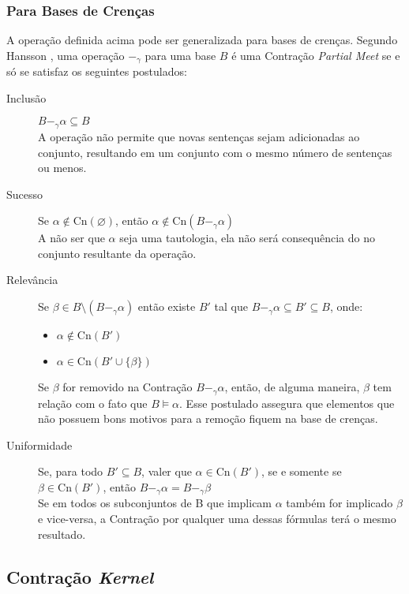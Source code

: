 \subsubsection{Para Bases de Crenças}

A operação definida acima pode ser generalizada para bases de crenças. Segundo Hansson \cite{revisaoHansson2}, uma operação $ -_{\gamma} $ para uma base $ B $ é uma Contração \textit{Partial Meet} se e só se satisfaz os seguintes postulados:

\begin{description}
	\item[Inclusão] $ B -_{\gamma} \alpha \subseteq B$ \\ A operação não permite que novas sentenças sejam adicionadas ao conjunto, resultando em um conjunto com o mesmo número de sentenças ou menos.
	\item[Sucesso] Se $ \alpha \notin \text{Cn}(\varnothing) $, então $ \alpha \notin \text{Cn}(B -_{\gamma} \alpha) $ \\ A não ser que $ \alpha $ seja uma tautologia, ela não será consequência do no conjunto resultante da operação.
	\item[Relevância] Se $ \beta \in B \setminus (B -_{\gamma} \alpha) $ então existe  $ B' $ tal que $B -_{\gamma} \alpha \subseteq B' \subseteq B $, onde:
	\begin{itemize}
		\item $ \alpha \notin \text{Cn}(B') $
		\item $ \alpha \in \text{Cn}(B' \cup \{\beta\}) $ 
	\end{itemize}
	Se $ \beta $ for removido na Contração $ B -_{\gamma} \alpha $, então, de alguma maneira, $ \beta $ tem relação com o fato que $ B \models \alpha$. Esse postulado assegura que elementos que não possuem bons motivos para a remoção fiquem na base de crenças.
	\item[Uniformidade] Se, para todo $B' \subseteq B $, valer que $ \alpha \in \text{Cn}(B') $, se e somente se $ \beta \in \text{Cn}(B') $, então $ B -_{\gamma} \alpha = B -_{\gamma} \beta $ \\
	Se em todos os subconjuntos de B que implicam $ \alpha $ também for implicado $ \beta $ e vice-versa, a Contração por qualquer uma dessas fórmulas terá o mesmo resultado.
\end{description}

\subsection{Contração \textit{Kernel}}

